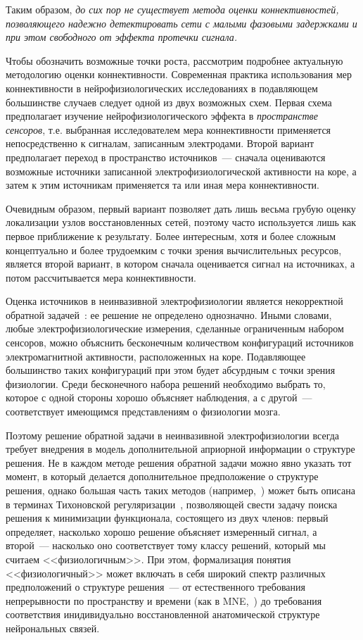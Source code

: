Таким образом, \emph{до сих пор не существует метода оценки коннективностей,
позволяющего надежно детектировать сети с малыми фазовыми задержками и при этом свободного
от эффекта протечки сигнала.}

Чтобы обозначить возможные точки роста, рассмотрим подробнее актуальную методологию оценки коннективности.
Современная практика использования мер коннективности в нейрофизиологических
исследованиях в подавляющем большинстве случаев следует одной из двух возможных схем.
Первая схема предполагает изучение нейрофизиологического эффекта  в \emph{пространстве сенсоров},
т.е. выбранная исследователем мера коннективности применяется непосредственно к сигналам,
записанным электродами.
Второй вариант предполагает переход в пространство источников~--- сначала оцениваются
возможные источники записанной электрофизиологической активности на коре, а затем к этим
источникам применяется та или иная  мера коннективности.

Очевидным образом, первый вариант позволяет дать лишь весьма грубую оценку локализации
узлов восстановленных сетей, поэтому часто используется лишь как первое приближение к результату.
Более интересным, хотя и более сложным концептуально и более
трудоемким с точки зрения вычислительных ресурсов, является второй вариант, в котором
сначала оценивается сигнал на источниках, а потом рассчитывается мера коннективности.

Оценка источников в неинвазивной электрофизиологии является
некорректной обратной задачей~\cite{Hamalainen1993}:
ее решение не определено однозначно. Иными словами, любые электрофизиологические измерения,
сделанные ограниченным набором сенсоров, можно объяснить бесконечным количеством конфигураций
источников электромагнитной активности, расположенных на коре. Подавляющее большинство таких конфигураций
при этом будет абсурдным с точки зрения физиологии. Среди бесконечного набора
решений необходимо выбрать то, которое с одной стороны хорошо объясняет наблюдения, а с другой~---
соответствует имеющимся представлениям о физиологии мозга.

Поэтому решение обратной задачи в неинвазивной электрофизиологии всегда требует
внедрения в модель дополнительной априорной информации о структуре решения. Не
в каждом методе решения обратной задачи можно явно указать тот момент, в
который делается дополнительное предположение о структуре решения, однако
большая часть таких методов (например,~\cite{Hamalainen1994, Uutela1999, Pascual-Marqui1994, Pascual-Marqui2002})
может быть описана в терминах Тихоновской регуляризации~\cite{tikhonov},
позволяющей свести задачу поиска решения к минимизации
функционала, состоящего из двух членов: первый определяет, насколько хорошо решение
объясняет измеренный сигнал, а второй~--- насколько оно соответствует тому классу
решений, который мы считаем <<физиологичным>>. При этом, формализация понятия
<<физиологичный>> может включать в себя широкий спектр различных предположений
о структуре решения~--- от естественного требования непрерывности по
пространству и времени (как в MNE,~\cite{Hamalainen1994}) до требования соответствия
инидивидуально восстановленной анатомической структуре нейрональных связей.

